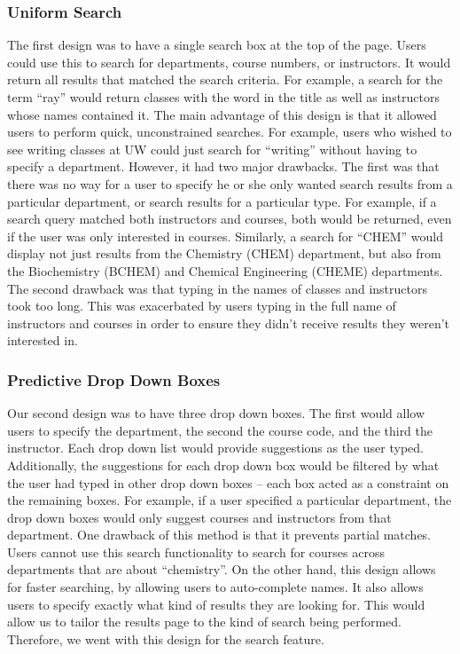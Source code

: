 \documentclass{chi2009}
\begin{document}
\subsubsection{Uniform Search}
The first design was to have a single search box at the top of the page. Users could use this to search for departments, course numbers, or instructors. It would return all results that matched the search criteria. For example, a search for the term ``ray'' would return classes with the word in the title as well as instructors whose names contained it. The main advantage of this design is that it allowed users to perform quick, unconstrained searches. For example, users who wished to see writing classes at UW could just search for ``writing'' without having to specify a department. However, it had two major drawbacks. The first was that there was no way for a user to specify he or she only wanted search results from a particular department, or search results for a particular type. For example, if a search query matched both instructors and courses, both would be returned, even if the user was only interested in courses. Similarly, a search for ``CHEM'' would display not just results from the Chemistry (CHEM) department, but also from the Biochemistry (BCHEM) and Chemical Engineering (CHEME) departments. The second drawback was that typing in the names of classes and instructors took too long. This was exacerbated by users typing in the full name of instructors and courses in order to ensure they didn't receive results they weren't interested in.

\subsubsection{Predictive Drop Down Boxes}
Our second design was to have three drop down boxes. The first would allow users to specify the department, the second the course code, and the third the instructor. Each drop down list would provide suggestions as the user typed. Additionally, the suggestions for each drop down box would be filtered by what the user had typed in other drop down boxes -- each box acted as a constraint on the remaining boxes. For example, if a user specified a particular department, the drop down boxes would only suggest courses and instructors from that department. One drawback of this method is that it prevents partial matches. Users cannot use this search functionality to search for courses across departments that are about ``chemistry''. On the other hand, this design allows for faster searching, by allowing users to auto-complete names. It also allows users to specify exactly what kind of results they are looking for. This would allow us to tailor the results page to the kind of search being performed. Therefore, we went with this design for the search feature.
\end{document}
